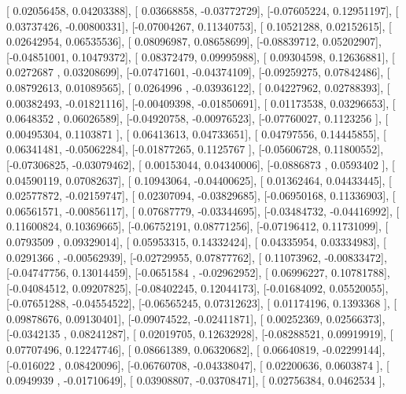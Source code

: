 \documentclass{article}
\begin{document}
       [ 0.02056458,  0.04203388],
       [ 0.03668858, -0.03772729],
       [-0.07605224,  0.12951197],
       [ 0.03737426, -0.00800331],
       [-0.07004267,  0.11340753],
       [ 0.10521288,  0.02152615],
       [ 0.02642954,  0.06535536],
       [ 0.08096987,  0.08658699],
       [-0.08839712,  0.05202907],
       [-0.04851001,  0.10479372],
       [ 0.08372479,  0.09995988],
       [ 0.09304598,  0.12636881],
       [ 0.0272687 ,  0.03208699],
       [-0.07471601, -0.04374109],
       [-0.09259275,  0.07842486],
       [ 0.08792613,  0.01089565],
       [ 0.0264996 , -0.03936122],
       [ 0.04227962,  0.02788393],
       [ 0.00382493, -0.01821116],
       [-0.00409398, -0.01850691],
       [ 0.01173538,  0.03296653],
       [ 0.0648352 ,  0.06026589],
       [-0.04920758, -0.00976523],
       [-0.07760027,  0.1123256 ],
       [ 0.00495304,  0.1103871 ],
       [ 0.06413613,  0.04733651],
       [ 0.04797556,  0.14445855],
       [ 0.06341481, -0.05062284],
       [-0.01877265,  0.1125767 ],
       [-0.05606728,  0.11800552],
       [-0.07306825, -0.03079462],
       [ 0.00153044,  0.04340006],
       [-0.0886873 ,  0.0593402 ],
       [ 0.04590119,  0.07082637],
       [ 0.10943064, -0.04400625],
       [ 0.01362464,  0.04433445],
       [ 0.02577872, -0.02159747],
       [ 0.02307094, -0.03829685],
       [-0.06950168,  0.11336903],
       [ 0.06561571, -0.00856117],
       [ 0.07687779, -0.03344695],
       [-0.03484732, -0.04416992],
       [ 0.11600824,  0.10369665],
       [-0.06752191,  0.08771256],
       [-0.07196412,  0.11731099],
       [ 0.0793509 ,  0.09329014],
       [ 0.05953315,  0.14332424],
       [ 0.04335954,  0.03334983],
       [ 0.0291366 , -0.00562939],
       [-0.02729955,  0.07877762],
       [ 0.11073962, -0.00833472],
       [-0.04747756,  0.13014459],
       [-0.0651584 , -0.02962952],
       [ 0.06996227,  0.10781788],
       [-0.04084512,  0.09207825],
       [-0.08402245,  0.12044173],
       [-0.01684092,  0.05520055],
       [-0.07651288, -0.04554522],
       [-0.06565245,  0.07312623],
       [ 0.01174196,  0.1393368 ],
       [ 0.09878676,  0.09130401],
       [-0.09074522, -0.02411871],
       [ 0.00252369,  0.02566373],
       [-0.0342135 ,  0.08241287],
       [ 0.02019705,  0.12632928],
       [-0.08288521,  0.09919919],
       [ 0.07707496,  0.12247746],
       [ 0.08661389,  0.06320682],
       [ 0.06640819, -0.02299144],
       [-0.016022  ,  0.08420096],
       [-0.06760708, -0.04338047],
       [ 0.02200636,  0.0603874 ],
       [ 0.0949939 , -0.01710649],
       [ 0.03908807, -0.03708471],
       [ 0.02756384,  0.0462534 ],
\end{document}
